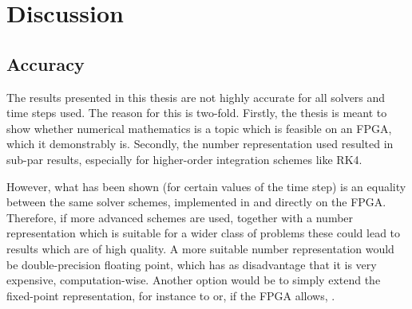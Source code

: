 \chapter{Discussion}

\section{Accuracy}
The results presented in this thesis are not highly accurate for all solvers and time steps used. The reason for this is two-fold. Firstly, the thesis is meant to show whether numerical mathematics is a topic which is feasible on an FPGA, which it demonstrably is. Secondly, the number representation used resulted in sub-par results, especially for higher-order integration schemes like RK4. 

However, what has been shown (for certain values of the time step) is an equality between the same solver schemes, implemented in \matlab{} and directly on the FPGA. Therefore, if more advanced schemes are used, together with a number representation which is suitable for a wider class of problems these could lead to results which are of high quality. A more suitable number representation would be double-precision floating point, which has as disadvantage that it is very expensive, computation-wise. Another option would be to simply extend the fixed-point representation, for instance to  or, if the FPGA allows, .

